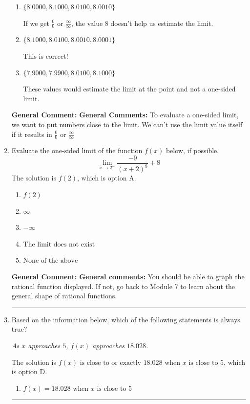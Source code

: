 \documentclass{extbook}[14pt]
\newcommand{\litem}[1]{\item #1

\rule{\textwidth}{0.4pt}}
\begin{document}
\begin{enumerate}
{\begin{enumerate}[label=\Alph*.]
If we get $\frac{0}{0}$ or $\frac{\infty}{\infty}$, the value 8 doesn't help us estimate the limit.
\item \( \{ 8.0000, 8.1000, 8.0100, 8.0010 \} \)

If we get $\frac{0}{0}$ or $\frac{\infty}{\infty}$, the value 8 doesn't help us estimate the limit.
\item \( \{ 8.1000, 8.0100, 8.0010, 8.0001 \} \)

This is correct!
\item \( \{ 7.9000, 7.9900, 8.0100, 8.1000 \} \)

These values would estimate the limit at the point and not a one-sided limit.
\end{enumerate}

\textbf{General Comment:} \textbf{General Comments:} To evaluate a one-sided limit, we want to put numbers close to the limit. We can't use the limit value itself if it results in $\frac{0}{0}$ or $\frac{\infty}{\infty}$
}
\litem{
Evaluate the one-sided limit of the function $f(x)$ below, if possible.
\[ \lim_{x \rightarrow 2^-} \frac{-9}{(x+2)^8}+8 \]The solution is \( f(2) \), which is option A.\begin{enumerate}[label=\Alph*.]
\item \( f(2) \)


\item \( \infty \)


\item \( -\infty \)


\item \( \text{The limit does not exist} \)


\item \( \text{None of the above} \)


\end{enumerate}

\textbf{General Comment:} \textbf{General comments:} You should be able to graph the rational function displayed. If not, go back to Module 7 to learn about the general shape of rational functions.
}
\litem{
Based on the information below, which of the following statements is always true?

\begin{center}
    \textit{ As $x$ approaches $5$, $f(x)$ approaches $18.028$. }
\end{center}
The solution is \( f(x) \text{ is close to or exactly } 18.028 \text{ when } x \text{ is close to } 5 \), which is option D.\begin{enumerate}[label=\Alph*.]
\item \( f(x) = 18.028 \text{ when } x \text{ is close to } 5 \)



\end{enumerate}}
\end{enumerate}
\end{document}
